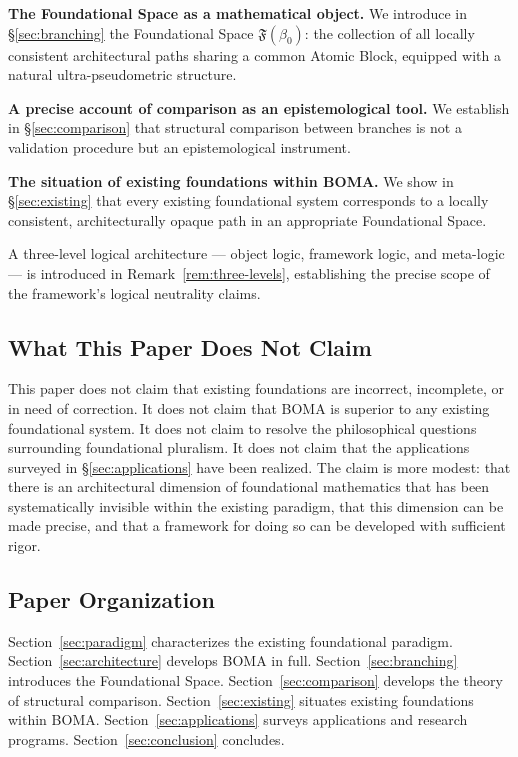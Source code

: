 \documentclass[12pt, a4paper]{article}
\theoremstyle{plain}
\theoremstyle{definition}
\theoremstyle{remark}
\newcommand{\FS}[1]{\mathfrak{F}(#1)}
\newcommand{\BOMA}{\textsf{BOMA}}
\begin{document}
\textbf{The Foundational Space as a mathematical object.}
We introduce in \S\ref{sec:branching} the Foundational Space
$\FS{\beta_0}$: the collection of all locally consistent
architectural paths sharing a common Atomic Block, equipped with
a natural ultra-pseudometric structure.

\textbf{A precise account of comparison as an epistemological
tool.} We establish in \S\ref{sec:comparison} that structural
comparison between branches is not a validation procedure but an
epistemological instrument.

\textbf{The situation of existing foundations within \BOMA{}.}
We show in \S\ref{sec:existing} that every existing foundational
system corresponds to a locally consistent, architecturally opaque
path in an appropriate Foundational Space.

A three-level logical architecture --- object logic, framework
logic, and meta-logic --- is introduced in
Remark~\ref{rem:three-levels}, establishing the precise scope of
the framework's logical neutrality claims.

\subsection{What This Paper Does Not Claim}
\label{subsec:notclaim}

This paper does not claim that existing foundations are
incorrect, incomplete, or in need of correction. It does not
claim that \BOMA{} is superior to any existing foundational
system. It does not claim to resolve the philosophical questions
surrounding foundational pluralism. It does not claim that the
applications surveyed in \S\ref{sec:applications} have been
realized. The claim is more modest: that there is an
architectural dimension of foundational mathematics that has been
systematically invisible within the existing paradigm, that this
dimension can be made precise, and that a framework for doing so
can be developed with sufficient rigor.

\subsection{Paper Organization}
\label{subsec:organization}

Section~\ref{sec:paradigm} characterizes the existing
foundational paradigm. Section~\ref{sec:architecture} develops
\BOMA{} in full. Section~\ref{sec:branching} introduces the
Foundational Space. Section~\ref{sec:comparison} develops the
theory of structural comparison. Section~\ref{sec:existing}
situates existing foundations within \BOMA{}.
Section~\ref{sec:applications} surveys applications and research
programs. Section~\ref{sec:conclusion} concludes.
\end{document}
